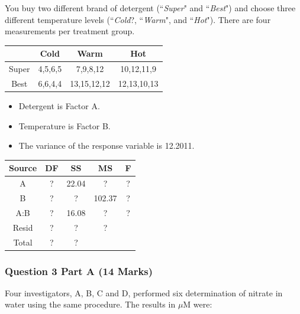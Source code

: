 \documentclass[a4paper,12pt]{article}
\begin{document}
\noindent You buy two different brand of detergent (``\textit{Super}" and ``\textit{Best}") and choose three different temperature levels (``\textit{Cold}?, ``\textit{Warm}", and ``\textit{Hot}"). There are four measurements per treatment group.
{
	\Large
	\begin{center}
		\begin{tabular}{|c||c|c|c|}
			\hline
			& Cold & Warm & Hot  \\ \hline \hline
			Super &  4,5,6,5    & 7,9,8,12     &  10,12,11,9    \\  \hline
			Best  &  6,6,4,4    & 13,15,12,12    & 12,13,10,13     \\  \hline
		\end{tabular} 
	\end{center}
}
\begin{itemize}
	\item Detergent is Factor A.
	\item Temperature is Factor B.
	\item The variance of the response variable is 12.2011.
\end{itemize}
{
	\Large
	\begin{center}
		\begin{tabular}{|c|c|c|c|c|}\hline
			Source & DF & SS & MS & F \\ \hline
			A  & \phantom{spa}? \phantom{spa}  & 22.04 & \phantom{spa}? \phantom{spa} & \phantom{spa}? \phantom{spa} \\ \hline
			B  &\phantom{spa}? \phantom{spa} & \phantom{spa}? \phantom{spa}  & 102.37 & \phantom{spa}? \phantom{spa} \\ \hline
			A:B  & \phantom{spa}? \phantom{spa}& 16.08 & \phantom{spa}? \phantom{spa} & \phantom{spa}? \phantom{spa} \\ \hline
			Resid & \phantom{spa}? \phantom{spa}& \phantom{spa}? \phantom{spa} & \phantom{spa}? \phantom{spa} & \\ \hline \hline
			Total & \phantom{spa}? \phantom{spa}&\phantom{spa}? \phantom{spa}  & \phantom{spa} & \\  \hline
		\end{tabular} 
	\end{center}
}

	\subsubsection*{Question 3 Part A (14 Marks)}
	Four investigators, A, B, C and D, performed six determination of nitrate in water using the same procedure. The results in $\mu$M were:
	
\end{document}

